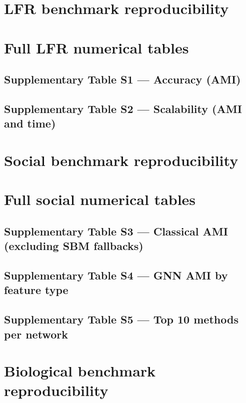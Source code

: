 \documentclass[11pt]{article}
\begin{document}
\section{LFR benchmark reproducibility}


\section{Full LFR numerical tables}
\subsection*{Supplementary Table S1 --- Accuracy (AMI)}


\subsection*{Supplementary Table S2 --- Scalability (AMI and time)}


\section{Social benchmark reproducibility}


\section{Full social numerical tables}
\subsection*{Supplementary Table S3 --- Classical AMI (excluding SBM fallbacks)}


\subsection*{Supplementary Table S4 --- GNN AMI by feature type}


\subsection*{Supplementary Table S5 --- Top 10 methods per network}


\section{Biological benchmark reproducibility}

\end{document}
